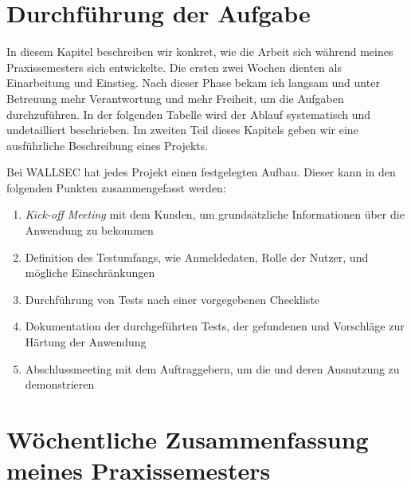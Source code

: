 \section{Durchführung der Aufgabe}

In diesem Kapitel beschreiben wir konkret, wie die Arbeit sich während meines Praxissemesters sich entwickelte. Die ersten zwei Wochen dienten als Einarbeitung und Einstieg. Nach dieser Phase bekam ich langsam und unter Betreuung mehr Verantwortung und mehr Freiheit, um die Aufgaben durchzuführen. In der folgenden Tabelle wird der Ablauf systematisch und undetailliert beschrieben. Im zweiten Teil dieses Kapitels geben wir eine ausführliche Beschreibung eines Projekts.

Bei WALLSEC hat jedes Projekt  einen festgelegten Aufbau. Dieser kann in den folgenden Punkten zusammengefasst werden:

\begin{enumerate} \label{Projektablauf}
    \item \textit{Kick-off Meeting} mit dem Kunden, um grundsätzliche Informationen über die Anwendung zu bekommen
    \item Definition des Testumfangs, wie Anmeldedaten, Rolle der Nutzer,  und mögliche Einschränkungen
    \item Durchführung von Tests nach einer vorgegebenen Checkliste
    \item Dokumentation der durchgeführten Tests, der gefundenen  und Vorschläge zur Härtung der Anwendung
    \item Abschlussmeeting mit dem Auftraggebern, um die  und deren Ausnutzung zu demonstrieren
\end{enumerate} 

\section{Wöchentliche Zusammenfassung meines Praxissemesters}

